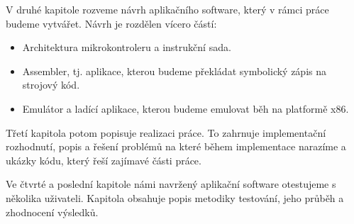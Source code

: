 \begin{introduction}
V druhé kapitole rozveme návrh aplikačního software, který v rámci práce budeme vytvářet. Návrh je rozdělen vícero částí:

\begin{itemize}
	\item Architektura mikrokontroleru a instrukční sada.
	\item Assembler, tj. aplikace, kterou budeme překládat symbolický zápis na strojový kód.
	\item Emulátor a ladící aplikace, kterou budeme emulovat běh na platformě x86.
\end{itemize}

Třetí kapitola potom popisuje realizaci práce. To zahrnuje implementační rozhodnutí, popis a řešení problémů na které během implementace narazíme a ukázky kódu, který řeší zajímavé části práce.

Ve čtvrté a poslední kapitole námi navržený aplikační software otestujeme s několika uživateli. Kapitola obsahuje popis metodiky testování, jeho průběh a zhodnocení výsledků.

\end{introduction}
